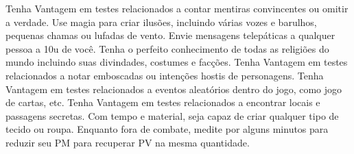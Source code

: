 \vfill
{}
{
	Tenha Vantagem em testes relacionados a contar mentiras convincentes ou omitir a verdade.
}
\vfill
{}
{
	Use magia para criar ilusões, incluindo várias vozes e barulhos, pequenas chamas ou lufadas de vento.
}
\vfill
{}
{
	Envie mensagens telepáticas a qualquer pessoa a 10u de você.
}
\vfill
{}
{
	Tenha o perfeito conhecimento de todas as religiões do mundo incluindo suas divindades, costumes e facções. 
}
\vfill
{}
{
	Tenha Vantagem em testes relacionados a notar emboscadas ou intenções hostis de personagens.
}
\vfill
{}
{
	Tenha Vantagem em testes relacionados a eventos aleatórios dentro do jogo, como jogo de cartas, etc. 
}
\vfill
{}
{
	Tenha Vantagem em testes relacionados a encontrar locais e passagens secretas.
}
\vfill
{}
{
	Com tempo e material, seja capaz de criar qualquer tipo de tecido ou roupa.
}
\vfill
{}
{
	Enquanto fora de combate, medite por alguns minutos para reduzir seu PM para recuperar PV na mesma quantidade.
}
%
\clearpage